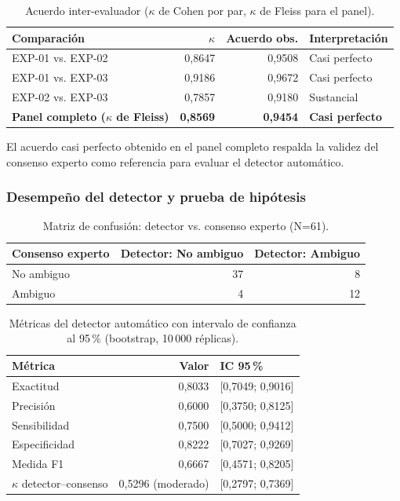 \documentclass[journal,onecolumn]{IEEEtran}
\begin{document}
\begin{table}[H]
	\centering
	\caption{Acuerdo inter-evaluador ($\kappa$ de Cohen por par, $\kappa$ de Fleiss para el panel).}
	\label{tab:acuerdo-interevaluador}
	\begin{tabular}{@{}lrrl@{}}
		\toprule
		\textbf{Comparación} & \textbf{$\kappa$} & \textbf{Acuerdo obs.} & \textbf{Interpretación} \\
		\midrule
		EXP-01 vs. EXP-02 & 0,8647 & 0,9508 & Casi perfecto \\
		EXP-01 vs. EXP-03 & 0,9186 & 0,9672 & Casi perfecto \\
		EXP-02 vs. EXP-03 & 0,7857 & 0,9180 & Sustancial \\
		\textbf{Panel completo ($\kappa$ de Fleiss)} & \textbf{0,8569} & \textbf{0,9454} & \textbf{Casi perfecto} \\
		\bottomrule
	\end{tabular}
\end{table}

El acuerdo casi perfecto obtenido en el panel completo respalda la validez
del consenso experto como referencia para evaluar el detector automático.

\subsubsection{Desempeño del detector y prueba de hipótesis}

\begin{table}[H]
	\centering
	\caption{Matriz de confusión: detector vs. consenso experto (N=61).}
	\label{tab:confusion-detector}
	\begin{tabular}{@{}lrr@{}}
		\toprule
		\textbf{Consenso experto} & \textbf{Detector: No ambiguo} & \textbf{Detector: Ambiguo} \\
		\midrule
		No ambiguo & 37 & 8 \\
		Ambiguo & 4 & 12 \\
		\bottomrule
	\end{tabular}
\end{table}

\begin{table}[H]
	\centering
	\caption{Métricas del detector automático con intervalo de confianza al 95\,\% (bootstrap, 10\,000 réplicas).}
	\label{tab:metricas-detector}
	\begin{tabular}{@{}lrl@{}}
		\toprule
		\textbf{Métrica} & \textbf{Valor} & \textbf{IC 95\,\%} \\
		\midrule
		Exactitud & 0,8033 & [0,7049; 0,9016] \\
		Precisión & 0,6000 & [0,3750; 0,8125] \\
		Sensibilidad & 0,7500 & [0,5000; 0,9412] \\
		Especificidad & 0,8222 & [0,7027; 0,9269] \\
		Medida F1 & 0,6667 & [0,4571; 0,8205] \\
		$\kappa$ detector--consenso & 0,5296 (moderado) & [0,2797; 0,7369] \\
		\bottomrule
	\end{tabular}
\end{table}
\end{document}

